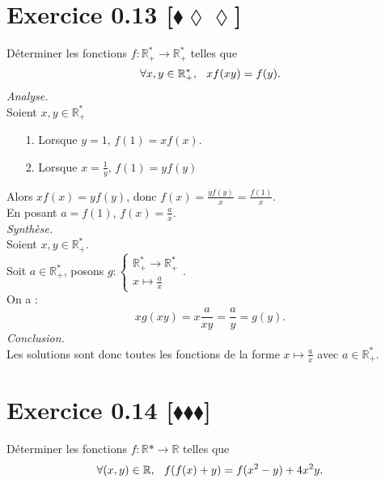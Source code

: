 \documentclass[10pt]{article}
\begin{document}
\section*{Exercice 0.13 [$\blacklozenge\lozenge\lozenge$]}
\begin{tcolorbox}[enhanced, width=6in, center, size=fbox, fontupper=\large, drop shadow southwest]
    Déterminer les fonctions $f: \mathbb{R}_+^* \rightarrow \mathbb{R}_+^*$ telles que 
    \begin{equation*}
        \forall{x,y\in\mathbb{R}^*_+}, \hspace{0.25cm} xf(xy) = f(y).
    \end{equation*}
    \emph{Analyse.}\\
    Soient $x,y\in\mathbb{R}^*_+$
    \begin{itemize}
        \item[1.] Lorsque $y=1$, $f(1)=xf(x)$.
        \item[2.] Lorsque $x=\frac{1}{y}$, $f(1)=yf(y)$
    \end{itemize}
    Alors $xf(x)=yf(y)$, donc $f(x)=\frac{yf(y)}{x}=\frac{f(1)}{x}$.\\
    En posant $a=f(1)$, $f(x)=\frac{a}{x}$.\\[0.25cm]
    \emph{Synthèse.}\\
    Soient $x,y\in\mathbb{R}^*_+$.\\
    Soit $a\in\mathbb{R^*_+}$, posons $g:\begin{cases}\mathbb{R}^*_+\rightarrow\mathbb{R}^*_+\\x\mapsto\frac{a}{x}\end{cases}$.\\
    On a :
    \begin{equation*}
        xg(xy)=x\frac{a}{xy}=\frac{a}{y}=g(y).
    \end{equation*}
    \emph{Conclusion.}\\
    Les solutions sont donc toutes les fonctions de la forme $x\mapsto\frac{a}{x}$ avec $a\in\mathbb{R^*_+}$.
\end{tcolorbox}

\section*{Exercice 0.14 [$\blacklozenge\blacklozenge\blacklozenge$]}
\begin{tcolorbox}[enhanced, width=6in, center, size=fbox, fontupper=\large, drop shadow southwest]
    Déterminer les fonctions $f: \mathbb{R}* \rightarrow \mathbb{R}$ telles que 
    \begin{equation*}
        \forall{(x,y)\in\mathbb{R}}, \hspace{0.25cm} f(f(x)+y) = f(x^2-y)+4x^2y.
    \end{equation*}

\end{tcolorbox}
\end{document}
